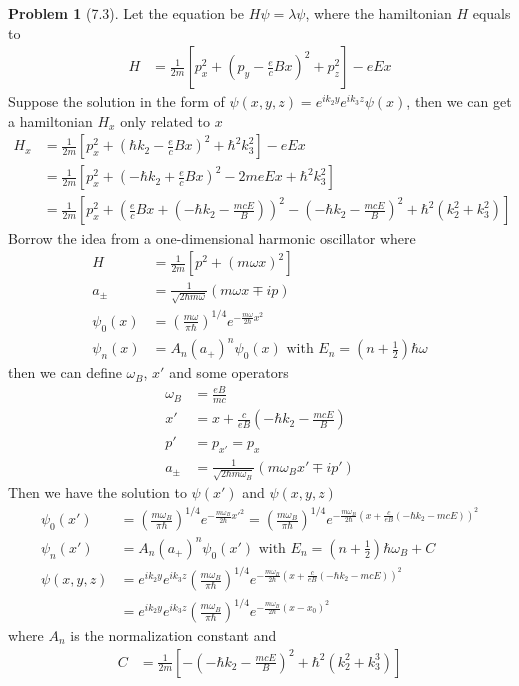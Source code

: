 \documentclass[twoside,11pt]{article}
\theoremstyle{definition}
\newtheorem{problem}{Problem}
\theoremstyle{remark}
\begin{document}
\begin{problem}[7.3]
Let the equation be $H\psi = \lambda\psi$, where the hamiltonian $H$ equals to
\begin{align*}
    H &= \frac{1}{2m} \left[p_x^2 + \left(p_y - \frac{e}{c}Bx\right)^2 + p_z^2
    \right] - eEx
\end{align*}
Suppose the solution in the form of $\psi(x, y, z) = e^{ik_2y}e^{ik_3z}\psi(x)$, then we can get
a hamiltonian $H_x$ only related to $x$
\begin{align*}
    H_x &=
    \frac{1}{2m}\left[
    p_x^2 + \left(\hbar k_2 - \frac{e}{c}Bx\right)^2 + \hbar^2k_3^2
    \right] - eEx\\
    &= \frac{1}{2m}\left[
    p_x^2 + \left(-\hbar k_2 + \frac{e}{c}Bx\right)^2 - 2meEx + \hbar^2k_3^2
    \right]\\
    &= \frac{1}{2m}\left[
    p_x^2 + \left(\frac{e}{c}Bx + (-\hbar k_2 - \frac{mcE}{B})\right)^2
    - (-\hbar k_2-\frac{mcE}{B})^2
    +\hbar^2(k_2^2+k_3^2)
    \right]
\end{align*}
Borrow the idea from a one-dimensional harmonic oscillator where
\begin{align*}
    H &= \frac{1}{2m}[p^2 + (m\omega x)^2]\\
    a_\pm &= \frac{1}{\sqrt{2\hbar m\omega}}(m\omega x \mp ip)\\
    \psi_0(x) &= \left(\frac{m\omega}{\pi\hbar}\right)^{1/4}e^{-\frac{m\omega}{2\hbar}x^2}\\
    \psi_n(x) &= A_n(a_+)^n\psi_0(x) \text{ with } E_n = \left(n + \frac{1}{2}\right)\hbar\omega
\end{align*}
then we can define $\omega_B$, $x'$ and some operators
\begin{align*}
    \omega_B &=  \frac{eB}{mc}\\
    x' &= x + \frac{c}{eB}(-\hbar k_2 - \frac{mcE}{B})\\
    p' &= p_{x'} = p_x\\
    a_\pm &= \frac{1}{\sqrt{2\hbar m\omega_B}}(m\omega_B x' \mp ip')
\end{align*}
Then we have the solution to $\psi(x')$ and $\psi(x, y, z)$
\begin{align*}
    \psi_0(x') &= \left(\frac{m\omega_B}{\pi\hbar}\right)^{1/4}e^{-\frac{m\omega_B}{2\hbar}x'^2}
    = \left(\frac{m\omega_B}{\pi\hbar}\right)^{1/4}e^{-\frac{m\omega_B}{2\hbar}(x+\frac{c}{eB}(-\hbar
    k_2 - mcE))^2}\\
    \psi_n(x') &= A_n(a_+)^n\psi_0(x') \text{ with } E_n = \left(n + \frac{1}{2}\right)\hbar\omega_B + C\\
    \psi(x, y, z) &= e^{ik_2y}e^{ik_3z}
    \left(\frac{m\omega_B}{\pi\hbar}\right)^{1/4}e^{-\frac{m\omega_B}{2\hbar}(x+\frac{c}{eB}(-\hbar
    k_2 - mcE))^2}\\
    &= e^{ik_2y}e^{ik_3z}
    \left(\frac{m\omega_B}{\pi\hbar}\right)^{1/4}e^{-\frac{m\omega_B}{2\hbar}(x-x_0)^2}
\end{align*}
where $A_n$ is the normalization constant and 
\begin{align*}
    C &= \frac{1}{2m}\left[
        - (-\hbar k_2-\frac{mcE}{B})^2
        +\hbar^2(k_2^2+k_3^3)
    \right]
\end{align*}


\end{problem}
\end{document}
